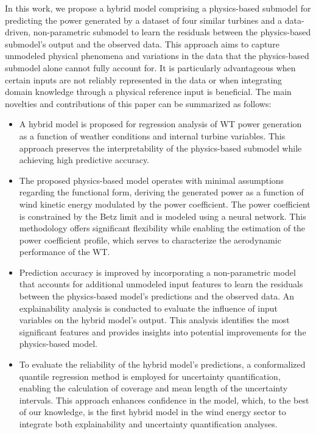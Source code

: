 \documentclass[preprint,12pt]{elsarticle}
\begin{document}
In this work, we propose a hybrid model comprising a physics-based submodel for predicting the power generated by a dataset of four similar turbines and a data-driven, non-parametric submodel to learn the residuals between the physics-based submodel's output and the observed data. This approach aims to capture unmodeled physical phenomena and variations in the data that the physics-based submodel alone cannot fully account for. It is particularly advantageous when certain inputs are not reliably represented in the data or when integrating domain knowledge through a physical reference input is beneficial.
The main novelties and contributions of this paper can be summarized as follows:
\begin{itemize}
    \item A hybrid model is proposed for regression analysis of WT power generation as a function of weather conditions and internal turbine variables. This approach preserves the interpretability of the physics-based submodel while achieving high predictive accuracy.
    \item The proposed physics-based model operates with minimal assumptions regarding the functional form, deriving the generated power as a function of wind kinetic energy modulated by the power coefficient. The power coefficient is constrained by the Betz limit and is modeled using a neural network. This methodology offers significant flexibility while enabling the estimation of the power coefficient profile, which serves to characterize the aerodynamic performance of the WT.
    \item Prediction accuracy is improved by incorporating a non-parametric model that accounts for additional unmodeled input features to learn the residuals between the physics-based model's predictions and the observed data. An explainability analysis is conducted to evaluate the influence of input variables on the hybrid model's output. This analysis identifies the most significant features and provides insights into potential improvements for the physics-based model.
    \item To evaluate the reliability of the hybrid model's predictions, a conformalized quantile regression method is employed for uncertainty quantification, enabling the calculation of coverage and mean length of the uncertainty intervals. This approach enhances confidence in the model, which, to the best of our knowledge, is the first hybrid model in the wind energy sector to integrate both explainability and uncertainty quantification analyses.
    
\end{itemize}
\end{document}
